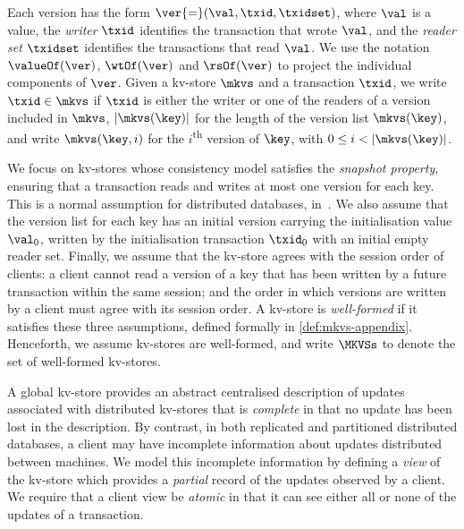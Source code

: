 Each version has the form 
$\ver {=} (\val, \txid, \txidset)$, where $\val$ is
a value, the \emph{writer} $\txid$ identifies the transaction that
wrote $\val$,  and the \emph{reader set} $\txidset$ identifies the
transactions that read $\val$. We use the notation 
$\valueOf(\ver)$,
$\wtOf(\ver)$ and $\rsOf(\ver)$ to project
the individual components of $\ver$.
Given a kv-store $\mkvs$ and a transaction $\txid$, we write 
$\txid \in \mkvs$ if $\txid$ 
is either the writer or 
one of the readers of a version included in $\mkvs$, 
$\lvert \mkvs(\key) \rvert$ for the length of the version
list $\mkvs(\key)$,
and write $\mkvs(\key, i)$ for the $i$\textsuperscript{th} version of $\key$, 
with $0 \leq i < \lvert \mkvs(\key) \rvert$.


We focus on kv-stores whose consistency model satisfies the
\emph{snapshot property}, ensuring that
a transaction reads and writes at most one version for each key.
This is a normal assumption for distributed databases, \eg in~\cite{ramp,rola,cops,wren,redblue,PSI,NMSI,gdur,clocksi,distrsi}.
We also assume that 
the version list for each key has an initial version 
carrying the initialisation value $\val_0$,  written by the 
initialisation transaction $\txid_0$ with an initial empty reader set.
Finally, we assume that the kv-store agrees with the session order of clients: 
a client cannot read a
version of a key that has been written by a future transaction within
the same session; and the order in which versions are written by a
client must agree with its session order.  A kv-store is
\emph{well-formed} if it satisfies these three assumptions, defined
formally in \cref{def:mkvs-appendix}.  Henceforth, we assume kv-stores
are well-formed, and write $\MKVSs$ to denote the set of well-formed
kv-stores.

A global kv-store provides an abstract centralised description of
updates associated with distributed kv-stores that is \emph{complete} in 
that no update has been lost in the description. By contrast, in
both replicated and partitioned distributed databases, a client may
have incomplete information about updates distributed between
machines.  We model this incomplete information by
defining a {\em view} of the kv-store which provides a {\em
  partial} record of the updates observed by a client. We require that a client view be {\em atomic} in that it can
see either all or none of the updates of a transaction.


